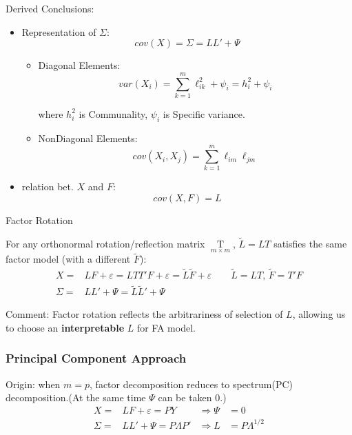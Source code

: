     Derived Conclusions:
    \begin{itemize}[topsep=2pt,itemsep=2pt]
        \item Representation of $ \Sigma  $:
        \begin{equation}
            cov(X)=\Sigma =LL'+\Psi  
        \end{equation}
        \begin{itemize}[topsep=2pt,itemsep=2pt]
            \item Diagonal Elements:
            \begin{equation}
                var(X_i)=\sum_{k=1}^m\ell^2_{ik}+\psi _i=h^2_{i}+\psi _i
            \end{equation}

            where $ h_{i}^2 $ is Communality, $ \psi _i $ is Specific variance.
            \item NonDiagonal Elements:
            \begin{equation}
                cov(X_i,X_j)=\sum_{k=1}^m\ell_{im}\ell_{jm} 
            \end{equation}
        \end{itemize}
        \item relation bet. $ X $ and $ F $:
        \begin{equation}
            cov(X,F)=L 
        \end{equation}
    \end{itemize}
    
    \begin{point}
        Factor Rotation
    \end{point}
    For any orthonormal rotation/reflection matrix $ \mathop{T}\limits_{m\times m}  $, $ \tilde{L}=LT $ satisfies the same factor model (with a different $ \tilde{F} $):
    \begin{equation*}
        \begin{aligned}
            X=&LF+\varepsilon =LTT'F+\varepsilon =\tilde{L}\tilde{F}+\varepsilon \qquad \tilde{L}=LT,\,\tilde{F}=T'F\\
            \Sigma =& LL'+\Psi =\tilde{L}\tilde{L}'+\Psi 
        \end{aligned}
    \end{equation*}

    Comment: Factor rotation reflects the arbitrariness of selection of $ L $, allowing us to choose an \textbf{interpretable} $ L $ for FA model.

        
\subsubsection{Principal Component Approach}
    Origin: when $ m=p $, factor decomposition reduces to spectrum(PC) decomposition.(At the same time $ \Psi  $ can be taken $ 0 $.)
    \begin{equation}
        \begin{aligned}
        X=&LF+\varepsilon =PY &\Rightarrow \Psi &=0\\
        \Sigma =&LL'+\Psi =P\Lambda P'&\Rightarrow L&=P\Lambda ^{1/2}
        \end{aligned}
    \end{equation}
    
